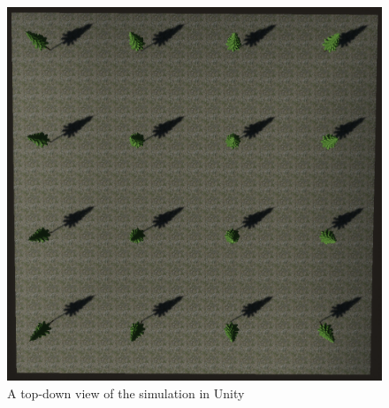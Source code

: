 \begin{figure}
\centering
\includegraphics[scale=.3]{Figures/Topdown Unity.png}
\decoRule
\caption[Top Down Unity]{A top-down view of the simulation in Unity}
\label{fig:CFDTopDownUnity}
\end{figure}

